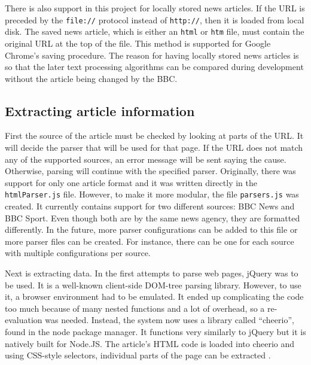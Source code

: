\documentclass[11pt,titlepage]{report}
\begin{document}
There is also support in this project for locally stored news articles. If the URL is preceded by the \lstinline|file://| protocol instead of \lstinline|http://|, then it is loaded from local disk. The saved news article, which is either an \lstinline|html| or \lstinline|htm| file, must contain the original URL at the top of the file. This method is supported for Google Chrome's saving procedure. The reason for having locally stored news articles is so that the later text processing algorithms can be compared during development without the article being changed by the BBC.
\subsection{Extracting article information}
First the source of the article must be checked by looking at parts of the URL. It will decide the parser that will be used for that page. If the URL does not match any of the supported sources, an error message will be sent saying the cause. Otherwise, parsing will continue with the specified parser. Originally, there was support for only one article format and it was written directly in the \lstinline|htmlParser.js| file. However, to make it more modular, the file \lstinline|parsers.js| was created. It currently contains support for two different sources: BBC News and BBC Sport. Even though both are by the same news agency, they are formatted differently. In the future, more parser configurations can be added to this file or more parser files can be created. For instance, there can be one for each source with multiple configurations per source. 

Next is extracting data. In the first attempts to parse web pages, jQuery was to be used. It is a well-known client-side DOM-tree parsing library. However, to use it, a browser environment had to be emulated. It ended up complicating the code too much because of many nested functions and a lot of overhead, so a re-evaluation was needed. Instead, the system now uses a library called ``cheerio'', found in the node package manager. It functions very similarly to jQuery but it is natively built for Node.JS. The article's HTML code is loaded into cheerio and using CSS-style selectors, individual parts of the page can be extracted \cite{cheerio}.
\end{document}
